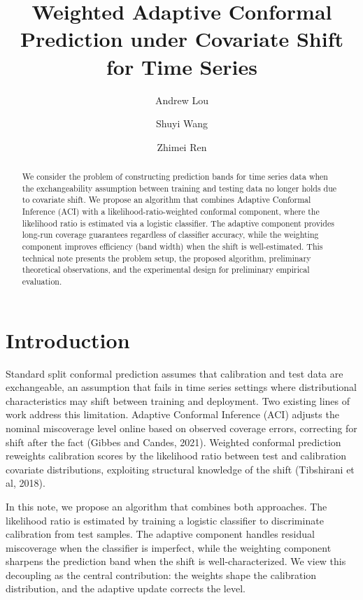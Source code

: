 \documentclass{article}
\title{\textbf{Weighted Adaptive Conformal Prediction under Covariate Shift for Time Series}}
\author{Andrew Lou \and Shuyi Wang \and Zhimei Ren}
\date{}
\numberwithin{equation}{section}
\begin{document}
\maketitle

\begin{abstract}
We consider the problem of constructing prediction bands for time series data when the exchangeability assumption between training and testing data no longer holds due to covariate shift. We propose an algorithm that combines Adaptive Conformal Inference (ACI) with a likelihood-ratio-weighted conformal component, where the likelihood ratio is estimated via a logistic classifier. The adaptive component provides long-run coverage guarantees regardless of classifier accuracy, while the weighting component improves efficiency (band width) when the shift is well-estimated. This technical note presents the problem setup, the proposed algorithm, preliminary theoretical observations, and the experimental design for preliminary empirical evaluation.
\end{abstract}

\section{Introduction}

Standard split conformal prediction assumes that calibration and test data are exchangeable, an assumption that fails in time series settings where distributional characteristics may shift between training and deployment. Two existing lines of work address this limitation. Adaptive Conformal Inference (ACI) adjusts the nominal miscoverage level online based on observed coverage errors, correcting for shift after the fact (Gibbes and Candes, 2021). Weighted conformal prediction reweights calibration scores by the likelihood ratio between test and calibration covariate distributions, exploiting structural knowledge of the shift (Tibshirani et al, 2018). 

In this note, we propose an algorithm that combines both approaches. The likelihood ratio is estimated by training a logistic classifier to discriminate calibration from test samples. The adaptive component handles residual miscoverage when the classifier is imperfect, while the weighting component sharpens the prediction band when the shift is well-characterized. We view this decoupling as the central contribution: the weights shape the calibration distribution, and the adaptive update corrects the level.
\end{document}
